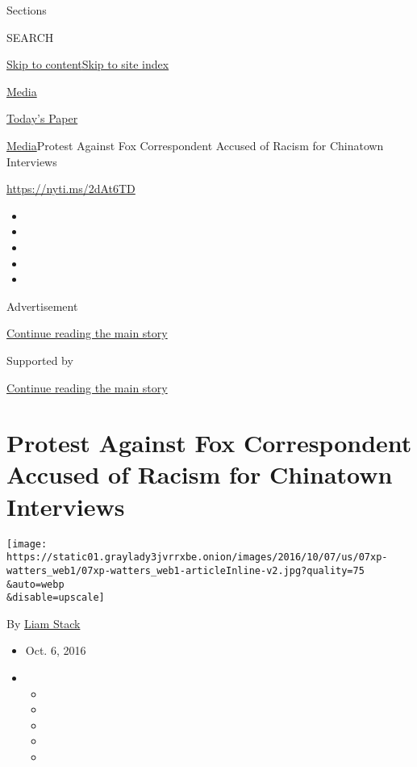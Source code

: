 Sections

SEARCH

\protect\hyperlink{site-content}{Skip to
content}\protect\hyperlink{site-index}{Skip to site index}

\href{https://www.nytimes3xbfgragh.onion/pages/business/media/index.html}{Media}

\href{https://myaccount.nytimes3xbfgragh.onion/auth/login?response_type=cookie\&client_id=vi}{}

\href{https://www.nytimes3xbfgragh.onion/section/todayspaper}{Today's
Paper}

\href{/pages/business/media/index.html}{Media}\textbar{}Protest Against
Fox Correspondent Accused of Racism for Chinatown Interviews

\url{https://nyti.ms/2dAt6TD}

\begin{itemize}
\item
\item
\item
\item
\item
\end{itemize}

Advertisement

\protect\hyperlink{after-top}{Continue reading the main story}

Supported by

\protect\hyperlink{after-sponsor}{Continue reading the main story}

\hypertarget{protest-against-fox-correspondent-accused-of-racism-for-chinatown-interviews}{%
\section{Protest Against Fox Correspondent Accused of Racism for
Chinatown
Interviews}\label{protest-against-fox-correspondent-accused-of-racism-for-chinatown-interviews}}

\texttt{[image: https://static01.graylady3jvrrxbe.onion/images/2016/10/07/us/07xp-watters\_web1/07xp-watters\_web1-articleInline-v2.jpg?quality=75\\\&auto=webp\\\&disable=upscale]}

By \href{http://www.nytimes3xbfgragh.onion/by/liam-stack}{Liam Stack}

\begin{itemize}
\item
  Oct. 6, 2016
\item
  \begin{itemize}
  \item
  \item
  \item
  \item
  \item
  \end{itemize}
\end{itemize}

